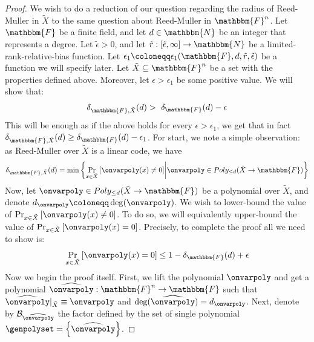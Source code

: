 \documentclass[10pt,a4paper]{article}
\newcommand{\definedas}[0]{\coloneqq}
\newcommand{\set}[1]{\left\{ #1 \right\}}
\newcommand{\suchthat}[0]{\middle|}
\newcommand{\basefield}[0]{\mathbbm{F}}
\newcommand{\blocklength}[0]{n}
\newcommand{\field}[0]{\basefield^{\blocklength}}
\newcommand{\degree}[0]{d}
\newcommand{\funcdef}[3]{#1:#2\rightarrow#3}
\newcommand{\restrictfunc}[2]{#1|_{#2}}
\newcommand{\factor}[0]{\mathcal{B}}
\newcommand{\allpolyset}[3]{Poly_{#1}(#2\rightarrow#3)}
\newcommand{\naturalnumbersset}[0]{\mathbbm{N}}
\newcommand{\variety}{{\tilde{X}}}
\newcommand{\lift}[1]{\widehat{#1}}
\newcommand{\rankbiasfunc}[0]{{\tilde{r}}}
\newcommand{\epsilonlimitedrankbias}[0]{{\tilde{\epsilon}}}
\newcommand{\prex}[2]{\Pr_{#1}\left[ #2 \right]}
\newcommand{\normalizedcodedistance}[2]{\delta_{#1}(#2)}
\newcommand{\normalizedcodedistanceex}[3]{\delta_{#1, #2}(#3)}
\begin{document}
\begin{proof}
    We wish to do a reduction of our question regarding the radius of Reed-Muller in $\variety$ to the same question about Reed-Muller in $\field$.
    Let $\basefield$ be a finite field, and let $\degree \in \naturalnumbersset$ be an integer that represents a degree.
    Let $\epsilonlimitedrankbias > 0$, and let $\funcdef{\rankbiasfunc}{[\epsilonlimitedrankbias, \infty]}{\naturalnumbersset}$ be a limited-rank-relative-bias function.
    Let $\epsilon_1 \definedas \epsilon_1(\basefield, \degree, \rankbiasfunc, \epsilonlimitedrankbias)$ be a function we will specify later.
    Let $\variety \subseteq \field$ be a set with the properties defined above.
    \newline
    Moreover, let $\epsilon > \epsilon_1$ be some positive value.
    We will show that:
    \[
        \normalizedcodedistanceex{\basefield}{\variety}{\degree} > \
        \normalizedcodedistance{\basefield}{\degree} - \epsilon
    \]
    This will be enough as if the above holds for every $\epsilon > \epsilon_1$, we get that in fact
    $\normalizedcodedistanceex{\basefield}{\variety}{\degree} \geq \normalizedcodedistance{\basefield}{\degree} - \epsilon_1$.
    \newline
    For start, we note a simple observation: as Reed-Muller over $\variety$ is a linear code, we have
    \[
        \normalizedcodedistanceex{\basefield}{\variety}{\degree} =
        \min \set{\prex{x \in \variety}{\onvarpoly(x) \neq 0} \suchthat \onvarpoly \in \allpolyset{\leq \degree}{\variety}{\basefield}}
    \]
    Now, let $\onvarpoly \in \allpolyset{\leq \degree}{\variety}{\basefield}$ be a polynomial over $\variety$,
    and denote $\degree_{\onvarpoly} \definedas \deg(\onvarpoly)$.
    We wish to lower-bound the value of $\prex{x \in \variety}{\onvarpoly(x) \neq 0}$.
    To do so, we will equivalently upper-bound the value of $\prex{x \in \variety}{\onvarpoly(x) = 0}$.
    Precisely, to complete the proof all we need to show is:
    \[
        \prex{x \in \variety}{\onvarpoly(x) = 0} \leq 1 - \normalizedcodedistance{\basefield}{\degree} + \epsilon
    \]
    \newline
    Now we begin the proof itself.
    First, we lift the polynomial $\onvarpoly$ and get a polynomial $\funcdef{\lift{\onvarpoly}}{\field}{\basefield}$
    such that $\restrictfunc{\lift{\onvarpoly}}{\variety} \equiv \onvarpoly$ and $\deg(\lift{\onvarpoly}) = \degree_{\onvarpoly}$.
    Next, denote by $\factor_{\lift{\onvarpoly}}$ the factor defined by the set of single polynomial $\genpolyset = \set {\lift{\onvarpoly}}$.

\end{proof}
\end{document}
